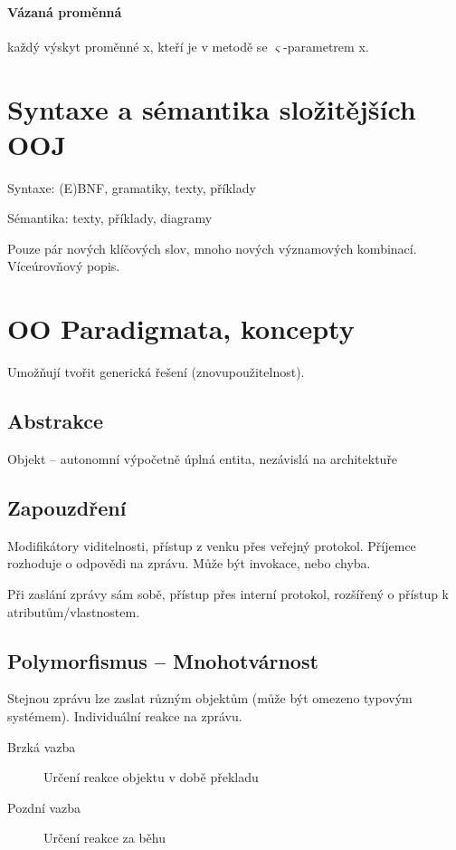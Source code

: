 \documentclass[a4wide]{report}
\begin{document}
\paragraph{Vázaná proměnná}
každý výskyt proměnné x, kteří je v metodě se $\varsigma$-parametrem x.

\section{Syntaxe a sémantika složitějších OOJ}

Syntaxe: (E)BNF, gramatiky, texty, příklady

Sémantika: texty, příklady, diagramy

Pouze pár nových klíčových slov, mnoho nových významových kombinací. Víceúrovňový popis.

\section{OO Paradigmata, koncepty}

Umožňují tvořit generická řešení (znovupoužitelnost).

\subsection{Abstrakce} Objekt -- autonomní výpočetně úplná entita, nezávislá na architektuře

\subsection{Zapouzdření}
Modifikátory viditelnosti, přístup z venku přes veřejný protokol. Příjemce rozhoduje o odpovědi na zprávu. Může být invokace, nebo chyba.

Při zaslání zprávy sám sobě, přístup přes interní protokol, rozšířený o přístup k atributům/vlastnostem.

\subsection{Polymorfismus -- Mnohotvárnost}

Stejnou zprávu lze zaslat různým objektům (může být omezeno typovým systémem). Individuální reakce na zprávu.

\begin{description}
	\item[Brzká vazba] Určení reakce objektu v době překladu
	\item[Pozdní vazba] Určení reakce za běhu
\end{description}
\end{document}
